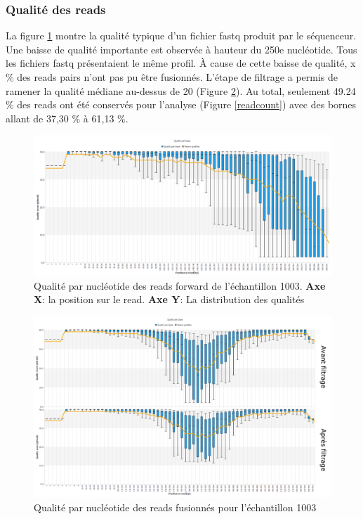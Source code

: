 \documentclass[12pt,a4paper]{article}
\begin{document}
\subsubsection{Qualité des reads}
La figure \ref{fastqt} montre la qualité typique d'un fichier fastq produit par le séquenceur. Une baisse de qualité importante est observée à hauteur du 250e nucléotide. Tous les fichiers fastq présentaient le même profil.
À cause de cette baisse de qualité, x \% des reads pairs n'ont pas pu être fusionnés.
L'étape de filtrage a permis de ramener la qualité médiane au-dessus de 20 (Figure \ref{fastqt_after}).
Au total, seulement 49.24 \% des reads ont été conservés pour l'analyse (Figure \ref{readcount}) avec des bornes allant de 37,30 \% à 61,13 \%.



\begin{figure}[ht]
\begin{center}
\includegraphics[scale=0.45]{img/1003_forward.png}\hfill
\end{center}
\caption{Qualité par nucléotide des reads forward de l'échantillon 1003. \textbf{Axe X}: la position sur le read. \textbf{Axe Y}: La distribution des qualités}
\label{fastqt}
\end{figure}


\begin{figure}[h]
\begin{center}
\includegraphics[scale=0.45]{img/duo_merging.png}\hfill
\end{center}
\caption{Qualité par nucléotide des reads fusionnés pour l'échantillon 1003}
\label{fastqt_after}
\end{figure}
\end{document}
